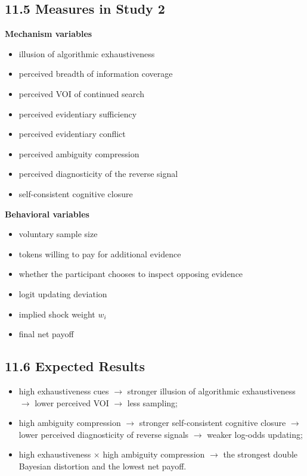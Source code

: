 \subsection*{11.5 Measures in Study 2}

\textbf{Mechanism variables}
\begin{itemize}[leftmargin=1.5em]
\item illusion of algorithmic exhaustiveness
\item perceived breadth of information coverage
\item perceived VOI of continued search
\item perceived evidentiary sufficiency
\item perceived evidentiary conflict
\item perceived ambiguity compression
\item perceived diagnosticity of the reverse signal
\item self-consistent cognitive closure
\end{itemize}

\textbf{Behavioral variables}
\begin{itemize}[leftmargin=1.5em]
\item voluntary sample size
\item tokens willing to pay for additional evidence
\item whether the participant chooses to inspect opposing evidence
\item logit updating deviation
\item implied shock weight \(w_i\)
\item final net payoff
\end{itemize}

\subsection*{11.6 Expected Results}

\begin{itemize}[leftmargin=1.5em]
\item high exhaustiveness cues \(\rightarrow\) stronger illusion of algorithmic exhaustiveness \(\rightarrow\) lower perceived VOI \(\rightarrow\) less sampling;
\item high ambiguity compression \(\rightarrow\) stronger self-consistent cognitive closure \(\rightarrow\) lower perceived diagnosticity of reverse signals \(\rightarrow\) weaker log-odds updating;
\item high exhaustiveness \(\times\) high ambiguity compression \(\rightarrow\) the strongest double Bayesian distortion and the lowest net payoff.
\end{itemize}

